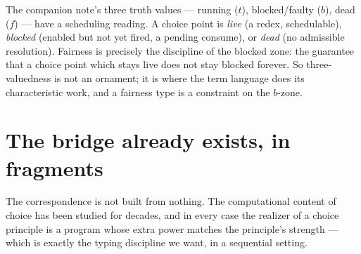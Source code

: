 \begin{remark}
The companion note's three truth values --- running ($t$), blocked/faulty ($b$), dead ($f$)
\cite{consensus} --- have a scheduling reading. A choice point is \emph{live} (a redex, schedulable),
\emph{blocked} (enabled but not yet fired, a pending consume), or \emph{dead} (no admissible
resolution). Fairness is precisely the discipline of the blocked zone: the guarantee that a choice
point which stays live does not stay blocked forever. So three-valuedness is not an ornament; it is
where the term language does its characteristic work, and a fairness type is a constraint on the
$b$-zone.
\end{remark}

\section{The bridge already exists, in fragments}\label{chs:sec:bridge}

The correspondence is not built from nothing. The computational content of choice has been studied
for decades, and in every case the realizer of a choice principle is a program whose extra power
matches the principle's strength --- which is exactly the typing discipline we want, in a sequential
setting.

